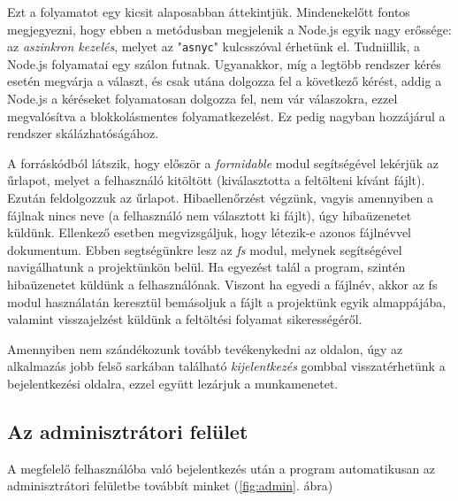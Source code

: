 Ezt a folyamatot egy kicsit alaposabban áttekintjük. Mindenekelőtt fontos megjegyezni, hogy ebben a metódusban megjelenik a Node.js egyik nagy erőssége: az \textit{aszinkron kezelés}, melyet az "\texttt{asnyc}" kulcsszóval érhetünk el. Tudniillik, a Node.js folyamatai egy szálon futnak. Ugyanakkor, míg a legtöbb rendszer kérés esetén megvárja a választ, és csak utána dolgozza fel a következő kérést, addig a Node.js a kéréseket folyamatosan dolgozza fel, nem vár válaszokra, ezzel megvalósítva a blokkolásmentes folyamatkezelést. Ez pedig nagyban hozzájárul a rendszer skálázhatóságához.

A forráskódból látszik, hogy először a \textit{formidable} modul segítségével lekérjük az űrlapot, melyet a felhasználó kitöltött (kiválasztotta a feltölteni kívánt fájlt). Ezután feldolgozzuk az űrlapot. Hibaellenőrzést végzünk, vagyis amennyiben a fájlnak nincs neve (a felhasználó nem választott ki fájlt), úgy hibaüzenetet küldünk. Ellenkező esetben megvizsgáljuk, hogy létezik-e azonos fájlnévvel dokumentum. Ebben segtségünkre lesz az \textit{fs} modul, melynek segítségével navigálhatunk a projektünkön belül. Ha egyezést talál a program, szintén hibaüzenetet küldünk a felhasználónak. Viszont ha egyedi a fájlnév, akkor az fs modul használatán keresztül bemásoljuk a fájlt a projektünk egyik almappájába, valamint visszajelzést küldünk a feltöltési folyamat sikerességéről.

Amennyiben nem szándékozunk tovább tevékenykedni az oldalon, úgy az alkalmazás jobb felső sarkában található \textit{kijelentkezés} gombbal visszatérhetünk a bejelentkezési oldalra, ezzel együtt lezárjuk a munkamenetet.


\subsection{Az adminisztrátori felület}

A megfelelő felhasználóba való bejelentkezés után a program automatikusan az adminisztrátori felületbe továbbít minket (\ref{fig:admin}. ábra)

